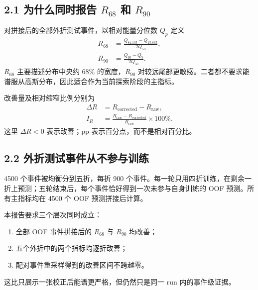 \documentclass[UTF8,11pt,a4paper,oneside,fontset=none]{ctexart}
\newcommand{\Rsixtyeight}{R_{68}}
\newcommand{\Rninty}{R_{90}}
\newcommand{\OOF}{\mathrm{OOF}}
\begin{document}
\subsection*{2.1 为什么同时报告 \(\Rsixtyeight\) 和 \(\Rninty\)}

对拼接后的全部外折测试事件，以相对能量分位数 \(Q_p\) 定义
\begin{align}
\Rsixtyeight
  &=\frac{Q_{84.135}-Q_{15.865}}{2Q_{50}},\\
\Rninty
  &=\frac{Q_{95}-Q_{5}}{2Q_{50}}.
\end{align}
\(\Rsixtyeight\) 主要描述分布中央约 68\% 的宽度，\(\Rninty\) 对较远尾部更敏感。二者都不要求能谱服从高斯分布，因此适合作为当前探索阶段的主指标。

改善量及相对缩窄比例分别为
\begin{align}
\Delta R &= R_{\mathrm{corrected}}-R_{\mathrm{raw}},\\
I_R &= \frac{R_{\mathrm{raw}}-R_{\mathrm{corrected}}}{R_{\mathrm{raw}}}\times100\%.
\end{align}
这里 \(\Delta R<0\) 表示改善；pp 表示百分点，而不是相对百分比。

\subsection*{2.2 外折测试事件从不参与训练}

\begin{center}
\end{center}

4500 个事件被均衡分到五折，每折 900 个事件。每一轮只用四折训练，在剩余一折上预测；五轮结束后，每个事件恰好得到一次未参与自身训练的 OOF 预测。所有主指标均在 4500 个 OOF 预测拼接后计算。

\begin{graybox}[title={如何理解“稳定”},fonttitle=\bfseries]
本报告要求三个层次同时成立：
\begin{enumerate}
  \item 全部 OOF 事件拼接后的 \(\Rsixtyeight\) 与 \(\Rninty\) 均改善；
  \item 五个外折中的两个指标均逐折改善；
  \item 配对事件重采样得到的改善区间不跨越零。
\end{enumerate}
这比只展示一张校正后能谱更严格，但仍然只是同一 run 内的事件级证据。
\end{graybox}
\end{document}
